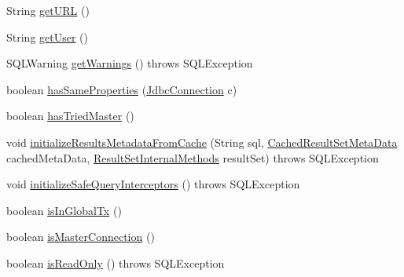 \begin{DoxyCompactItemize}
\item 
String \mbox{\hyperlink{classcom_1_1mysql_1_1cj_1_1jdbc_1_1ha_1_1_multi_host_my_s_q_l_connection_a52febdf3fd28e122d17a8f0713427fa6}{get\+U\+RL}} ()
\item 
String \mbox{\hyperlink{classcom_1_1mysql_1_1cj_1_1jdbc_1_1ha_1_1_multi_host_my_s_q_l_connection_a3e6181cd20398fc2968c8ea0204f7c95}{get\+User}} ()
\item 
S\+Q\+L\+Warning \mbox{\hyperlink{classcom_1_1mysql_1_1cj_1_1jdbc_1_1ha_1_1_multi_host_my_s_q_l_connection_a223c3d0b682be6c82b4e86cd9880711f}{get\+Warnings}} ()  throws S\+Q\+L\+Exception 
\item 
boolean \mbox{\hyperlink{classcom_1_1mysql_1_1cj_1_1jdbc_1_1ha_1_1_multi_host_my_s_q_l_connection_a149e10365c36e34d7585bc42515e2fcf}{has\+Same\+Properties}} (\mbox{\hyperlink{interfacecom_1_1mysql_1_1cj_1_1jdbc_1_1_jdbc_connection}{Jdbc\+Connection}} c)
\item 
boolean \mbox{\hyperlink{classcom_1_1mysql_1_1cj_1_1jdbc_1_1ha_1_1_multi_host_my_s_q_l_connection_a2eb48d606b888ae970ca17640c54b082}{has\+Tried\+Master}} ()
\item 
void \mbox{\hyperlink{classcom_1_1mysql_1_1cj_1_1jdbc_1_1ha_1_1_multi_host_my_s_q_l_connection_a410fa65fc66b0e6e92c54adad9afc601}{initialize\+Results\+Metadata\+From\+Cache}} (String sql, \mbox{\hyperlink{interfacecom_1_1mysql_1_1cj_1_1jdbc_1_1result_1_1_cached_result_set_meta_data}{Cached\+Result\+Set\+Meta\+Data}} cached\+Meta\+Data, \mbox{\hyperlink{interfacecom_1_1mysql_1_1cj_1_1jdbc_1_1result_1_1_result_set_internal_methods}{Result\+Set\+Internal\+Methods}} result\+Set)  throws S\+Q\+L\+Exception 
\item 
void \mbox{\hyperlink{classcom_1_1mysql_1_1cj_1_1jdbc_1_1ha_1_1_multi_host_my_s_q_l_connection_a0e3142ef146b788ca33dd4d80c56dd21}{initialize\+Safe\+Query\+Interceptors}} ()  throws S\+Q\+L\+Exception 
\item 
boolean \mbox{\hyperlink{classcom_1_1mysql_1_1cj_1_1jdbc_1_1ha_1_1_multi_host_my_s_q_l_connection_a12a895a23d45e4ac2df69fed6c022fef}{is\+In\+Global\+Tx}} ()
\item 
boolean \mbox{\hyperlink{classcom_1_1mysql_1_1cj_1_1jdbc_1_1ha_1_1_multi_host_my_s_q_l_connection_a0c1fb78db80d2aedf2d8aa89ff182b5a}{is\+Master\+Connection}} ()
\item 
boolean \mbox{\hyperlink{classcom_1_1mysql_1_1cj_1_1jdbc_1_1ha_1_1_multi_host_my_s_q_l_connection_abe5fbbc469276ab5bb4b1cea4eb1cfee}{is\+Read\+Only}} ()  throws S\+Q\+L\+Exception 
\item 

\end{DoxyCompactItemize}
